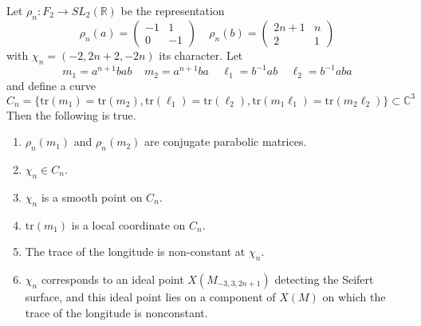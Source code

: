 \documentclass[10pt,a4paper]{amsart}
\begin{document}
\begin{lemma}\label{lma:limiting}
Let $\rho_n: F_2 \to SL_2(\mathbb{R})$ be the representation 
\begin{equation}
	\rho_n(a) = \begin{pmatrix}-1 & 1 \\ 0 & -1\end{pmatrix} \ \ \ \ \ \rho_n(b) = \begin{pmatrix}2n+1 & n \\ 2 & 1\end{pmatrix}
\end{equation}
with $\chi_n = (-2, 2n+2, -2n)$ its character. Let 
\begin{equation}
	m_1 = a^{n+1}bab \ \ \ \ \ m_2 = a^{n+1}ba \ \ \ \ \ \ell_1 = b^{-1}ab \ \ \ \ \ \ell_2 = b^{-1}aba
\end{equation}
and define a curve
\begin{equation}
	C_n = \{\text{tr}(m_1) = \text{tr}(m_2), \text{tr}(\ell_1) = \text{tr}(\ell_2), \text{tr}(m_1\ell_1) = \text{tr}(m_2\ell_2)\} \subset \mathbb{C}^3
\end{equation}
Then the following is true.
\begin{enumerate}
	\item $\rho_n(m_1)$ and $\rho_n(m_2)$ are conjugate parabolic matrices.
	\item $\chi_n \in C_n$. 
	\item $\chi_n$ is a smooth point on $C_n$.
	\item $\text{tr}(m_1)$ is a local coordinate on $C_n$.
	\item The trace of the longitude is non-constant at $\chi_n$.
	\item $\chi_n$ corresponds to an ideal point $X(M_{-3, 3, 2n+1})$ detecting the Seifert surface, and this ideal point lies on a component of $X(M)$ on which the trace of the longitude is nonconstant.
\end{enumerate}
\end{lemma}
\end{document}
